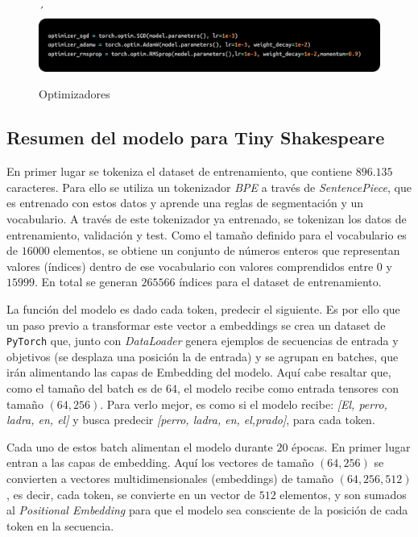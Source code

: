 \documentclass[11pt]{book}
\theoremstyle{plain}
\theoremstyle{definition}
\begin{document}
\begin{figure}[h]
    \centering´
    \includegraphics[width=0.5\linewidth]{img/optimizers.png}
    \caption{Optimizadores \parencite{stackoverflow_sgd_optimizer}}
    \label{fig:placeholder22}
\end{figure}


\subsection{Resumen del modelo para Tiny Shakespeare}

En primer lugar se tokeniza el dataset de entrenamiento, que contiene $896.135$ caracteres. Para ello se utiliza un tokenizador \textit{BPE} a través de \textit{SentencePiece}, que es entrenado con estos datos y aprende una reglas de segmentación y un vocabulario. A través de este tokenizador ya entrenado, se tokenizan los datos de entrenamiento, validación y test. Como el tamaño definido para el vocabulario es de $16000$ elementos, se obtiene un conjunto de números enteros que representan valores (índices) dentro de ese vocabulario con valores comprendidos entre $0$ y $15999$. En total se generan $265566$ índices para el dataset de entrenamiento. 

La función del modelo es dado cada token, predecir el siguiente. Es por ello que un paso previo a transformar este vector a embeddings se crea un dataset de \texttt{PyTorch} que, junto con \textit{DataLoader} genera ejemplos de secuencias de entrada y objetivos (se desplaza una posición la de entrada) y se agrupan en batches, que irán alimentando las capas de Embedding del modelo. Aquí cabe resaltar que, como el tamaño del batch es de $64$, el modelo recibe como entrada tensores con tamaño $(64,256)$. Para verlo mejor, es como si el modelo recibe: \textit{[El, perro, ladra, en, el]} y busca predecir \textit{[perro, ladra, en, el,prado]}, para cada token.


Cada uno de estos batch alimentan el modelo durante $20$ épocas. En primer lugar entran a las capas de embedding. Aquí los vectores de tamaño $(64,256)$ se convierten a vectores multidimensionales (embeddings) de tamaño $(64,256, 512)$, es decir, cada token, se convierte en un vector de $512$ elementos, y son sumados al \textit{Positional Embedding} para que el modelo sea consciente de la posición de cada token en la secuencia. 
\end{document}
